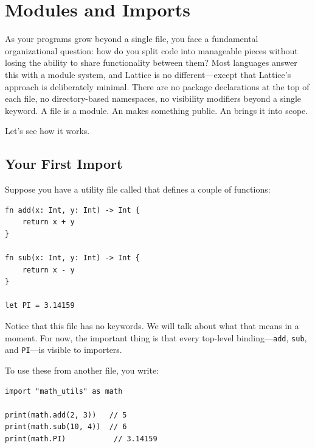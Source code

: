\chapter{Modules and Imports}\label{ch:modules-imports}


As your programs grow beyond a single file, you face a fundamental organizational question: how do you split code into manageable pieces without losing the ability to share functionality between them?
Most languages answer this with a module system, and Lattice is no different---except that Lattice's approach is deliberately minimal.
There are no package declarations at the top of each file, no directory-based namespaces, no visibility modifiers beyond a single keyword.
A file is a module.
An  makes something public.
An  brings it into scope.

Let's see how it works.

\section{Your First Import}\label{sec:first-import}

Suppose you have a utility file called  that defines a couple of functions:

\begin{lstlisting}[language=Lattice, caption={math\_utils.lat --- a utility module}]
fn add(x: Int, y: Int) -> Int {
    return x + y
}

fn sub(x: Int, y: Int) -> Int {
    return x - y
}

let PI = 3.14159
\end{lstlisting}

Notice that this file has no  keywords.
We will talk about what that means in a moment.
For now, the important thing is that every top-level binding---\lstinline|add|, \lstinline|sub|, and \lstinline|PI|---is visible to importers.

To use these from another file, you write:

\begin{lstlisting}[language=Lattice, caption={main.lat --- importing a module}]
import "math_utils" as math

print(math.add(2, 3))   // 5
print(math.sub(10, 4))  // 6
print(math.PI)           // 3.14159
\end{lstlisting}

